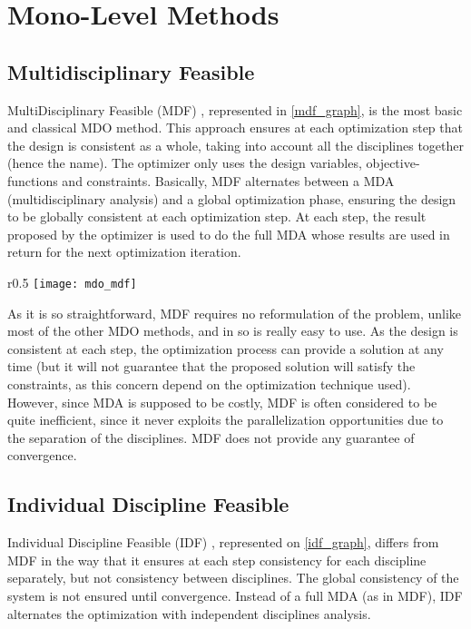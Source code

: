 \section{Mono-Level Methods}

\subsection{Multidisciplinary Feasible}

MultiDisciplinary Feasible (MDF) \cite{cramer1994problem}, represented in \figurename{} \ref{mdf_graph}, is the most basic and classical MDO method. This approach ensures at each optimization step that the design is consistent as a whole, taking into account all the disciplines together (hence the name). The optimizer only uses the design variables, objective-functions and constraints.
Basically, MDF alternates between a MDA (multidisciplinary analysis) and a global optimization phase, ensuring the design to be globally consistent at each optimization step. At each step, the result proposed by the optimizer is used to do the full MDA whose results are used in return for the next optimization iteration.

\begin{wrapfigure}{r}{0.5\textwidth}
\centering
\texttt{[image: mdo\_mdf]}
\caption{MDF method.}\label{mdf_graph}
\end{wrapfigure}

As it is so straightforward, MDF requires no reformulation of the problem, unlike most of the other MDO methods, and in so is really easy to use. As the design is consistent at each step, the optimization process can provide a solution at any time (but it will not guarantee that the proposed solution will satisfy the constraints, as this concern depend on the optimization technique used). However, since MDA is supposed to be costly, MDF is often considered to be quite inefficient, since it never exploits the parallelization opportunities due to the separation of the disciplines. MDF does not provide any guarantee of convergence.

\subsection{Individual Discipline Feasible}

Individual Discipline Feasible (IDF) \cite{cramer1994problem}, represented on \figurename{} \ref{idf_graph}, differs from MDF in the way that it ensures at each step consistency for each discipline separately, but not consistency between disciplines. The global consistency of the system is not ensured until convergence.
Instead of a full MDA (as in MDF), IDF alternates the optimization with independent disciplines analysis.

